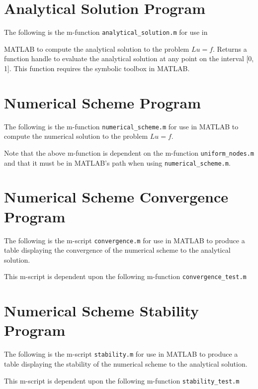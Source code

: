 \documentclass{article}
\begin{document}
\newpage
\begin{appendices}
  \section{Analytical Solution Program}\label{append_analytical}
  The following is the m-function \texttt{analytical\_solution.m} for use in

  MATLAB to compute the analytical solution to the problem $Lu = f$. Returns
  a function handle to evaluate the analytical solution at any point on the
  interval [0, 1]. This function requires the symbolic toolbox in MATLAB.
  

  \newpage
  \section{Numerical Scheme Program}\label{append_numerical}
  The following is the m-function \texttt{numerical\_scheme.m} for use in MATLAB
  to compute the numerical solution to the problem $Lu = f$.
  

  Note that the above m-function is dependent on the m-function
  \texttt{uniform\_nodes.m} and that it must be in MATLAB's path when using
  \texttt{numerical\_scheme.m}.
  

  \newpage
  \section{Numerical Scheme Convergence Program}\label{append_convergence}
  The following is the m-script \texttt{convergence.m} for use in MATLAB to
  produce a table displaying the convergence of the numerical scheme to the analytical
  solution.
  

  This m-script is dependent upon the following m-function \texttt{convergence\_test.m}
  

  \newpage
  \section{Numerical Scheme Stability Program}\label{append_stability}
  The following is the m-script \texttt{stability.m} for use in MATLAB to
  produce a table displaying the stability of the numerical scheme to the analytical
  solution.
  

  This m-script is dependent upon the following m-function \texttt{stability\_test.m}
  

\end{appendices}
\end{document}
